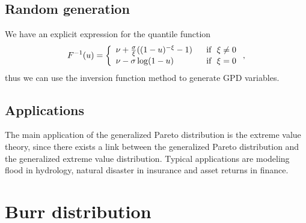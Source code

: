 \subsection{Random generation}
We have an explicit expression for the quantile function
$$
F^{-1}(u) = \left\{
\begin{array}{ll}
\nu+\frac{\sigma}{\xi}((1-u)^{-\xi}-1) & \textrm{~~if~~} \xi \neq 0\\
\nu-\sigma\log(1-u) & \textrm{~~if~~} \xi=0\\
\end{array}
\right.,
$$
thus we can use the inversion function method to generate GPD variables.

\subsection{Applications}
The main application of the generalized Pareto distribution is the extreme value theory, since there exists a link between the generalized Pareto distribution and the generalized extreme value distribution. Typical applications are modeling flood in hydrology, natural disaster in insurance and asset returns in finance.

\section{Burr distribution}
